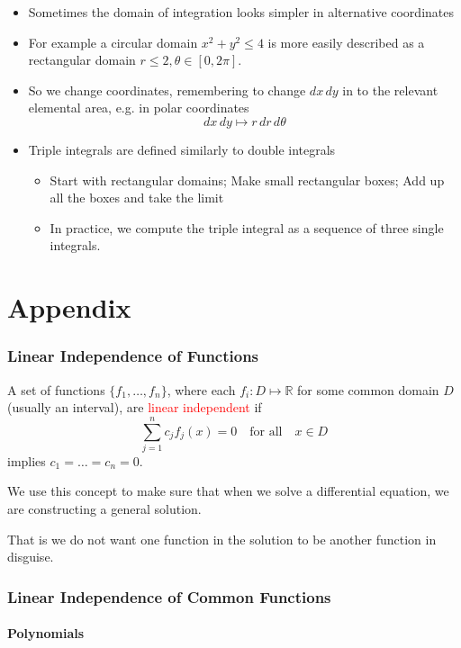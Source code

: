 \documentclass{article}
\newcommand{\mR}{\mathbb R}
\begin{document}
\begin{itemize}
\item
Sometimes the domain of integration looks simpler in alternative coordinates
\item
For example a circular domain $x^ 2 + y^2 \leq 4$ is more easily described as a rectangular domain $r \leq 2, \theta \in [0, 2\pi]$.
\item
So we change coordinates, remembering to change $dx\,dy$ in to the relevant elemental area, e.g. in polar coordinates
$$
dx\,dy \mapsto r \,dr \, d\theta
$$
\item
Triple integrals are defined similarly to double integrals
\begin{itemize}
\item
Start with rectangular domains; 
Make small rectangular boxes;
Add up all the boxes and take the limit
\item
In practice, we compute the triple integral as a sequence of three single integrals.
\end{itemize}
\end{itemize}


\newpage

\part{Appendix}

\section{Linear Independence of Functions}

A set of functions $\lbrace f_1, \ldots , f_n \rbrace$, where each $f_i : D \mapsto \mR$ for some common domain $D$
(usually an interval), are \textcolor{red}{linear independent} if
$$
\sum_{j = 1}^n c_j f_j (x) = 0\quad \mbox{for all} \quad x \in D
$$
implies $c_1 = \ldots = c_n = 0$.

We use this concept to make sure that when we solve a differential equation, we are constructing
a general solution.

That is we do not want one function in the solution to be another function in disguise.


\section{Linear Independence of Common Functions}
\subsection{Polynomials}
\end{document}
